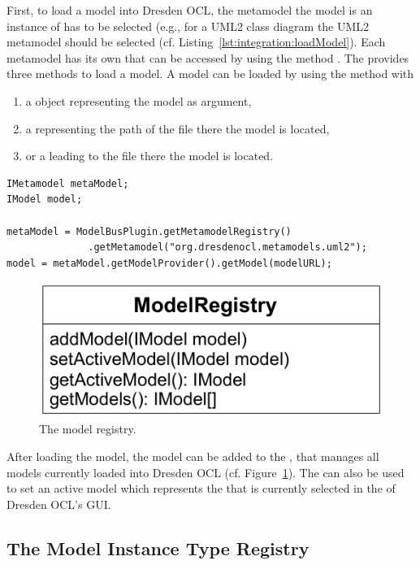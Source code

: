 First, to load a model into Dresden OCL, the metamodel the model is an instance
of has to be selected (e.g., for a UML2 class diagram the UML2 metamodel should
be selected (cf. Listing~\ref{lst:integration:loadModel}). Each metamodel has
its own  that can be accessed by using the method
. The  provides three
methods to load a model. A model can be loaded by using the method
 with

\begin{enumerate}
	\item a  object representing the model as argument,
	\item a  representing the path of the file there the model is 
	  located,
	\item or a  leading to the file there the model is located.
\end{enumerate}

\lstset{
  language=Java
}
\begin{lstlisting}[caption={How to load a model.}, captionpos=b, label=lst:integration:loadModel, float]
IMetamodel metaModel;
IModel model;

metaModel = ModelBusPlugin.getMetamodelRegistry()
              .getMetamodel("org.dresdenocl.metamodels.uml2");
model = metaModel.getModelProvider().getModel(modelURL);
\end{lstlisting}

\begin{figure}[!b]
	\centering
	\includegraphics[width=.55\linewidth]{figures/integration/modelRegistry}
	\caption{The model registry.}
	\label{pic:integration:modelRegistry}
\end{figure}

After loading the model, the model can be added to the ,
that manages all models currently loaded into Dresden OCL (cf. 
Figure~\ref{pic:integration:modelRegistry}). The  can also 
be used to set an active model which represents the  that is 
currently selected in the  of Dresden OCL's GUI.


\subsection{The Model Instance Type Registry}

